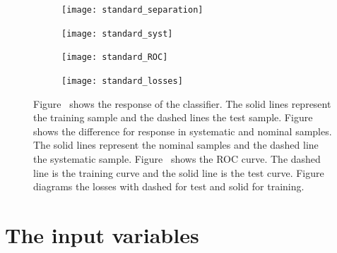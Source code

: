 \begin{figure}[htbp]
    \centering
    \begin{subfigure}[b]{0.48\textwidth}
        \texttt{[image: standard\_separation]}
        \caption{}
        \label{fig:simple:final:sepa}
    \end{subfigure}
\quad
    \begin{subfigure}[b]{0.48\textwidth}
        \texttt{[image: standard\_syst]}
        \caption{}
        \label{fig:simple:final:syst}
    \end{subfigure}

    \begin{subfigure}[b]{0.48\textwidth}
		\texttt{[image: standard\_ROC]}
		\caption{}
		\label{fig:simple:final:roc}
	\end{subfigure}
\quad
	\begin{subfigure}[b]{0.48\textwidth}
		\texttt{[image: standard\_losses]}
		\caption{}
		\label{fig:simple:final:loss}
	\end{subfigure}
    \caption[Network performance of the classifier]{Figure~ shows the response of the classifier. The solid lines represent the training sample and the dashed lines the test sample. Figure~ shows the difference for response in systematic and nominal samples. The solid lines represent the nominal samples and the dashed line the systematic sample. Figure~ shows the ROC curve. The dashed line is the training curve and the solid line is the test curve. Figure~ diagrams the losses with dashed for test and solid for training.}
	\label{fig:simple:final}
\end{figure}


\section{The input variables}

